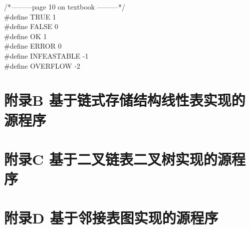 \documentclass[supercite]{Experimental_Report}
\theoremstyle{definition}
\begin{document}
\noindent
/*---------page 10 on textbook ---------*/\\
\#define TRUE 1\\
\#define FALSE 0\\
\#define OK 1\\
\#define ERROR 0\\
\#define INFEASTABLE -1\\
\#define OVERFLOW -2\\
\newpage
\section{附录B 基于链式存储结构线性表实现的源程序}
\newpage
\section{附录C 基于二叉链表二叉树实现的源程序}
\newpage
\section{附录D 基于邻接表图实现的源程序}
\end{document}
